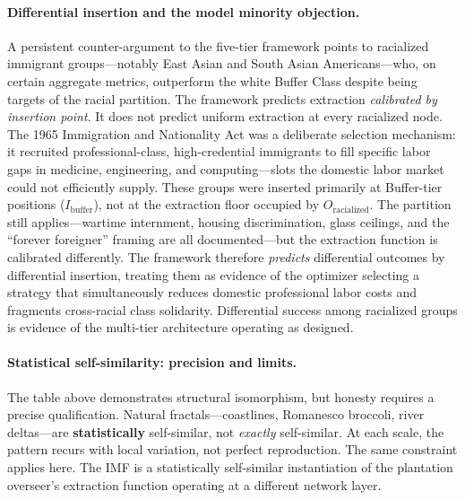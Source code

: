 \paragraph{Differential insertion and the model minority objection.}
A persistent counter-argument to the five-tier framework points to racialized immigrant groups---notably East Asian and South Asian Americans---who, on certain aggregate metrics, outperform the white Buffer Class despite being targets of the racial partition. The framework predicts extraction \textit{calibrated by insertion point}. It does not predict uniform extraction at every racialized node. The 1965 Immigration and Nationality Act was a deliberate selection mechanism: it recruited professional-class, high-credential immigrants to fill specific labor gaps in medicine, engineering, and computing---slots the domestic labor market could not efficiently supply. These groups were inserted primarily at Buffer-tier positions ($I_{\text{buffer}}$), not at the extraction floor occupied by $O_{\text{racialized}}$. The partition still applies---wartime internment, housing discrimination, glass ceilings, and the ``forever foreigner'' framing are all documented---but the extraction function is calibrated differently. The framework therefore \textit{predicts} differential outcomes by differential insertion, treating them as evidence of the optimizer selecting a strategy that simultaneously reduces domestic professional labor costs and fragments cross-racial class solidarity. Differential success among racialized groups is evidence of the multi-tier architecture operating as designed.

\paragraph{Statistical self-similarity: precision and limits.}
The table above demonstrates structural isomorphism, but honesty requires a precise qualification. Natural fractals---coastlines, Romanesco broccoli, river deltas---are \textbf{statistically} self-similar, not \textit{exactly} self-similar. At each scale, the pattern recurs with local variation, not perfect reproduction. The same constraint applies here. The IMF is a statistically self-similar instantiation of the plantation overseer's extraction function operating at a different network layer.

